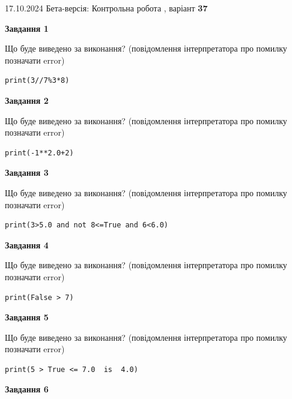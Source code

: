 \documentclass[12pt, ukrainian]{article}
\begin{document}
{\Large{17.10.2024 Бета-версія: Контрольна робота , варіант  \No \textbf { 37 }\par}}
{
\begin {large}
{\begin {center}\textbf{Завдання 1}\end {center}}

Що буде виведено за виконання? (повідомлення інтерпретатора про помилку позначати error)\par
\begin{verbatim}
print(3//7%3*8)
\end{verbatim}

{\begin {center}\textbf{Завдання 2}\end {center}}

Що буде виведено за виконання? (повідомлення інтерпретатора про помилку позначати error)\par
\begin{verbatim}
print(-1**2.0+2)
\end{verbatim}

{\begin {center}\textbf{Завдання 3}\end {center}}

Що буде виведено за виконання? (повідомлення інтерпретатора про помилку позначати error)\par
\begin{verbatim}
print(3>5.0 and not 8<=True and 6<6.0)
\end{verbatim}

{\begin {center}\textbf{Завдання 4}\end {center}}

Що буде виведено за виконання? (повідомлення інтерпретатора про помилку позначати error)\par
\begin{verbatim}
print(False > 7)
\end{verbatim}

{\begin {center}\textbf{Завдання 5}\end {center}}

Що буде виведено за виконання? (повідомлення інтерпретатора про помилку позначати error)\par
\begin{verbatim}
print(5 > True <= 7.0  is  4.0)
\end{verbatim}

{\begin {center}\textbf{Завдання 6}\end {center}}


\end{large}}
\end{document}
